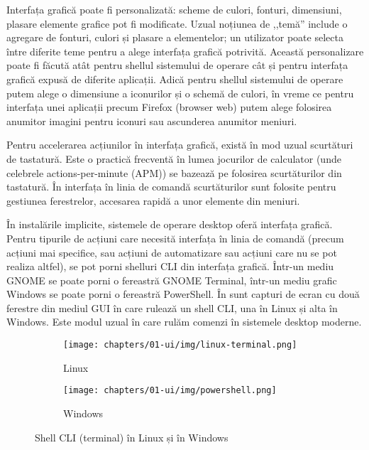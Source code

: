 Interfața grafică poate fi personalizată: scheme de culori, fonturi, dimensiuni, plasare elemente grafice pot fi modificate.
Uzual noțiunea de ,,temă'' include o agregare de fonturi, culori și plasare a elementelor;
un utilizator poate selecta între diferite teme pentru a alege interfața grafică potrivită.
Această personalizare poate fi făcută atât pentru shellul sistemului de operare cât și pentru interfața grafică expusă de diferite aplicații.
Adică pentru shellul sistemului de operare putem alege o dimensiune a iconurilor și o schemă de culori, în vreme ce pentru interfața unei aplicații precum Firefox (browser web) putem alege folosirea anumitor imagini pentru iconuri sau ascunderea anumitor meniuri.

Pentru accelerarea acțiunilor în interfața grafică, există în mod uzual scurtături de tastatură.
Este o practică frecventă în lumea jocurilor de calculator (unde celebrele actions-per-minute (APM)) se bazează pe folosirea scurtăturilor din tastatură.
În interfața în linia de comandă scurtăturilor sunt folosite pentru gestiunea ferestrelor, accesarea rapidă a unor elemente din meniuri.

În instalările implicite, sistemele de operare desktop oferă interfața grafică.
Pentru tipurile de acțiuni care necesită interfața în linia de comandă (precum acțiuni mai specifice, sau acțiuni de automatizare sau acțiuni care nu se pot realiza altfel), se pot porni shelluri CLI din interfața grafică.
Într-un mediu GNOME se poate porni o fereastră GNOME Terminal, într-un mediu grafic Windows se poate porni o fereastră PowerShell.
În  sunt capturi de ecran cu două ferestre din mediul GUI în care rulează un shell CLI, una în Linux și alta în Windows.
Este modul uzual în care rulăm comenzi în sistemele desktop moderne.

\begin{figure}[!htbp]
  \centering
  \begin{subfigure}[b]{0.6\textwidth}
    \texttt{[image: chapters/01-ui/img/linux-terminal.png]}
    \caption{Linux}
    \label{fig:ui:shell-cli:linux}
  \end{subfigure}

  \begin{subfigure}[b]{0.6\textwidth}
    \texttt{[image: chapters/01-ui/img/powershell.png]}
    \caption{Windows}
    \label{fig:ui:shell-cli:windows}
  \end{subfigure}

  \caption{Shell CLI (terminal) în Linux și în Windows}
  \label{fig:ui:shell-cli-linux-windows}
\end{figure}

